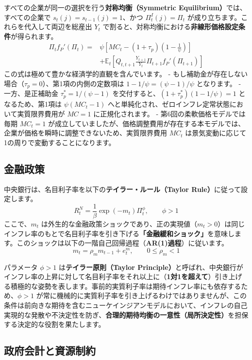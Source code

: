 \documentclass[
  japanese,
  lualatex,
  ja=standard,
  12pt,
  a4paper]{ltjsarticle}
\begin{document}
すべての企業が同一の選択を行う\textbf{対称均衡（Symmetric
Equilibrium）}では、すべての企業で \(s_t(j)=s_{t-1}(j)=1\)、かつ
\(\Pi_t^I(j)=\Pi_t\) が成り立ちます。これらを代入して両辺を総産出
\(Y_t\)
で割ると、対称均衡における\textbf{非線形価格設定条件}が得られます。 \[
\begin{aligned}
\Pi_tf_P'(\Pi_t)={}&
\psi\left[
MC_t-(1+\tau_p)\left(1-\frac{1}{\psi}\right)
\right]\\
&+\mathbb{E}_t\left[
Q_{t,t+1}\frac{Y_{t+1}}{Y_t}
\Pi_{t+1}f_P'(\Pi_{t+1})
\right]
\end{aligned}
\] この式は極めて豊かな経済学的直観を含んでいます。 -
もし補助金が存在しない場合（\(\tau_p=0\)）、第1項の内側の定数項は
\(1-1/\psi = (\psi-1)/\psi\) となります。 - 一方、是正補助金
\(\tau_p^* = 1/(\psi-1)\) を交付すると、\((1+\tau_p^*)(1-1/\psi)=1\)
となるため、第1項は \(\psi(MC_t - 1)\)
へと単純化され、ゼロインフレ定常状態において実質限界費用が \(MC=1\)
に正規化されます。 - 第6回の柔軟価格モデルでは毎期 \(MC_t=1\)
が成立していましたが、価格調整費用が存在する本モデルでは、企業が価格を瞬時に調整できないため、実質限界費用
\(MC_t\) は景気変動に応じて1の周りで変動することになります。

\subsection{金融政策}\label{ux91d1ux878dux653fux7b56}

中央銀行は、名目利子率を以下の\textbf{テイラー・ルール（Taylor
Rule）}に従って設定します。 \[
R_t^N=\frac{1}{\beta}\exp(-m_t)\Pi_t^\phi,
\qquad
\phi>1
\] ここで、\(m_t\)
は外生的な金融政策ショックであり、正の実現値（\(m_t>0\)）は同じインフレ率のもとで名目利子率を引き下げる\textbf{「金融緩和ショック」}を意味します。このショックは以下の一階自己回帰過程（\textbf{AR(1)過程}）に従います。
\[
m_t=\rho_m m_{t-1}+e_t^m,
\qquad
0\leq\rho_m<1
\]

パラメータ \(\phi>1\) は\textbf{テイラー原則（Taylor
Principle）}と呼ばれ、中央銀行がインフレ率の上昇に対して名目利子率をそれ以上に（\textbf{1対1を超えて}）引き上げる積極的な姿勢を表します。事前的実質利子率は期待インフレ率にも依存するため、\(\phi>1\)
が常に機械的に実質利子率を引き上げるわけではありませんが、この条件は前向きな期待を含むニューケインジアンモデルにおいて、インフレの自己実現的な発散や不決定性を防ぎ、\textbf{合理的期待均衡の一意性（局所決定性）}を担保する決定的な役割を果たします。

\subsection{政府会計と資源制約}\label{ux653fux5e9cux4f1aux8a08ux3068ux8cc7ux6e90ux5236ux7d04}
\end{document}
